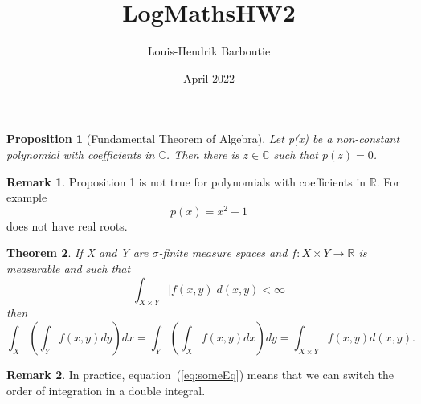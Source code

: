 \documentclass{article}
\title{LogMathsHW2}
\author{Louis-Hendrik Barboutie}
\date{April 2022}
\newtheorem{theorem}{Theorem}
\newtheorem{proposition}[theorem]{Proposition}
\theoremstyle{definition}
\newtheorem*{remark}{Remark}
\begin{document}
\maketitle

\begin{proposition}[Fundamental Theorem of Algebra]
    Let p(x) be a non-constant polynomial with coefficients in $\mathbb{C}$. Then there is $z \in \mathbb{C}$ such that $p(z) = 0$.
\end{proposition}

\begin{remark}
    Proposition 1 is not true for polynomials with coefficients in $\mathbb{R}$. For example 
    \begin{equation}
        p(x) = x^2 + 1
    \end{equation}
    does not have real roots.
\end{remark}

\begin{theorem}
    If X and Y are $\sigma$-finite measure spaces and $f: X \times Y \rightarrow \mathbb{R}$ is measurable and such that 
    \begin{equation*}
        \int_{X  \times Y}|f(x,y)|d(x,y) < \infty
    \end{equation*}
    then
    \begin{equation}
        \int_X \left( \int_Y f(x,y)dy \right)dx = \int_Y \left( \int_X f(x,y)dx \right)dy = \int_{X  \times Y}f(x,y)d(x,y).
        \label{eq:someEq}
    \end{equation}
\end{theorem}

\begin{remark}
    In practice, equation~(\ref{eq:someEq}) means that we can switch the order of integration in a double integral.
\end{remark}
\end{document}
